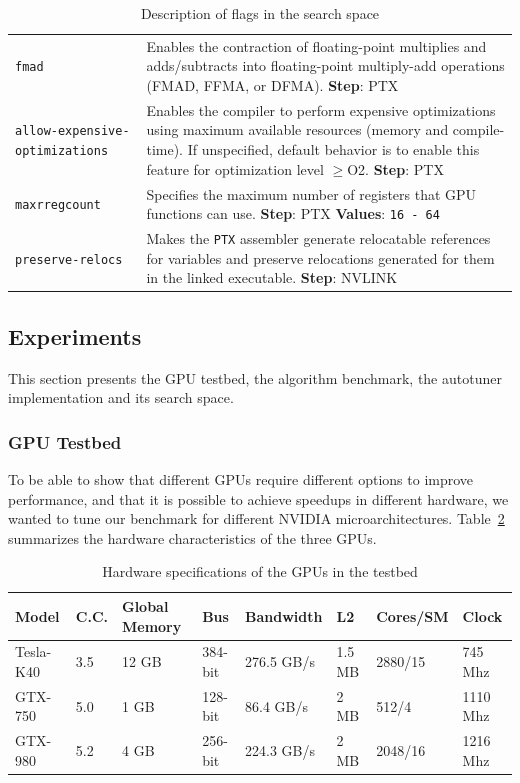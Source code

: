 \begin{table}[htpb]
\begin{tabular}{lp{}}
            \addlinespace{}
        \texttt{fmad} & Enables the contraction of floating-point multiplies and adds/subtracts into floating-point multiply-add operations (FMAD, FFMA, or DFMA). \textbf{Step}: PTX \\
            \addlinespace{}
        \texttt{allow-expensive-optimizations} & Enables the compiler to perform expensive optimizations using maximum available resources (memory and compile-time). If unspecified, default behavior is to enable this feature for optimization level $\geqslant$O2. \textbf{Step}: PTX \\
            \addlinespace{}
        \texttt{maxrregcount} & Specifies the maximum number of registers that GPU functions can use. \textbf{Step}: PTX \textbf{Values}: \texttt{16 - 64} \\
            \addlinespace{}
        \texttt{preserve-relocs} & Makes the \texttt{PTX} assembler generate relocatable references for variables and preserve relocations generated for them in the linked executable. \textbf{Step}: NVLINK \\
            \bottomrule
        \end{tabular}
    \caption{Description of flags in the search space}
    \label{tab:flags}
\end{table}

\subsection{Experiments}

This section presents the GPU testbed, the algorithm benchmark, the
autotuner implementation and its search space.

\subsubsection{GPU Testbed}

To be able to show that different GPUs require different options to improve
performance, and that it is possible to achieve speedups in different hardware,
we wanted to tune our benchmark for different NVIDIA microarchitectures.
Table~\ref{tab:GPUs} summarizes the hardware characteristics of the three GPUs.

\begin{table}[thpb]
    \centering
    \footnotesize
    \begin{tabular}{llllllll}
        \toprule
        \textbf{Model}&\textbf{C.C.}&\textbf{Global Memory}&\textbf{Bus}&\textbf{Bandwidth}&\textbf{L2}&\textbf{Cores/SM}&\textbf{Clock} \\ \midrule
        Tesla-K40&3.5&12 GB&384-bit&276.5 GB/s&1.5 MB&2880/15&745 Mhz \\
        GTX-750&5.0&1 GB&128-bit&86.4 GB/s&2 MB&512/4&1110 Mhz \\
        GTX-980&5.2&4 GB&256-bit&224.3 GB/s&2 MB&2048/16&1216 Mhz \\ \bottomrule
    \end{tabular}
    \caption{Hardware specifications of the GPUs in the testbed}
    \label{tab:GPUs}
\end{table}

